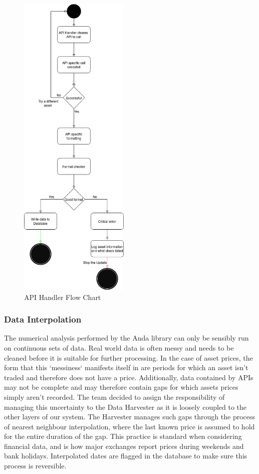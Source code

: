 \documentclass[main.tex]{subfiles}
\begin{document}
\begin{figure}[H]
    \centering
    \includegraphics[width=0.47\textwidth]{04Design/04Pictures/api_handler_v3.png}
    \caption{API Handler Flow Chart \cite{TR}}
\end{figure}

\subsubsection{Data Interpolation}
The numerical analysis performed by the Anda library can only be sensibly run on continuous sets of data. Real world data is often messy and needs to be cleaned before it is suitable for further processing. In the case of asset prices, the form that this `messiness` manifests itself in are periods for which an asset isn't traded and therefore does not have a price. Additionally, data contained by APIs may not be complete and may therefore contain gaps for which assets prices simply aren't recorded. The team decided to assign the responsibility of managing this uncertainty to the Data Harvester as it is loosely coupled to the other layers of our system. The Harvester manages such gaps through the process of nearest neighbour interpolation, where the last known price is assumed to hold for the entire duration of the gap. This practice is standard when considering financial data, and is how major exchanges report prices during weekends and bank holidays. Interpolated dates are flagged in the database to make sure this process is reversible. 
\end{document}
